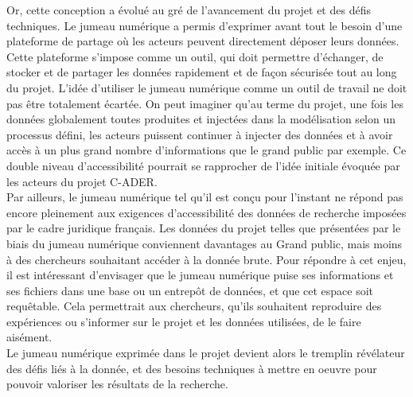 Or, cette conception a évolué au gré de l’avancement du projet et des défis techniques. Le jumeau numérique a permis d'exprimer avant tout le besoin d'une plateforme de partage où les acteurs peuvent directement déposer leurs données. Cette plateforme s’impose comme un outil, qui doit permettre d’échanger, de stocker et de partager les données rapidement et de façon sécurisée tout au long du projet. L'idée d'utiliser le jumeau numérique comme un outil de travail ne doit pas être totalement écartée. On peut imaginer qu’au terme du projet, une fois les données globalement toutes produites et injectées dans la modélisation selon un processus défini, les acteurs puissent continuer à injecter des données et à avoir accès à un plus grand nombre d’informations que le grand public par exemple. Ce double niveau d’accessibilité pourrait se rapprocher de l’idée initiale évoquée par les acteurs du projet C-ADER.\\

Par ailleurs, le jumeau numérique tel qu’il est conçu pour l’instant ne répond pas encore pleinement aux exigences d'accessibilité des données de recherche imposées par le cadre juridique français. Les données du projet telles que présentées par le biais du jumeau numérique conviennent davantages au Grand public, mais moins à des chercheurs souhaitant accéder à la donnée brute. Pour répondre à cet enjeu, il est intéressant d'envisager que le jumeau numérique puise ses informations et ses fichiers dans une base ou un entrepôt de données, et que cet espace soit requêtable. Cela permettrait aux chercheurs, qu'ils souhaitent reproduire des expériences ou s'informer sur le projet et les données utilisées, de le faire aisément.\\ 

Le jumeau numérique exprimée dans le projet devient alors le tremplin révélateur des défis liés à la donnée, et des besoins techniques à mettre en oeuvre pour pouvoir valoriser les résultats de la recherche.